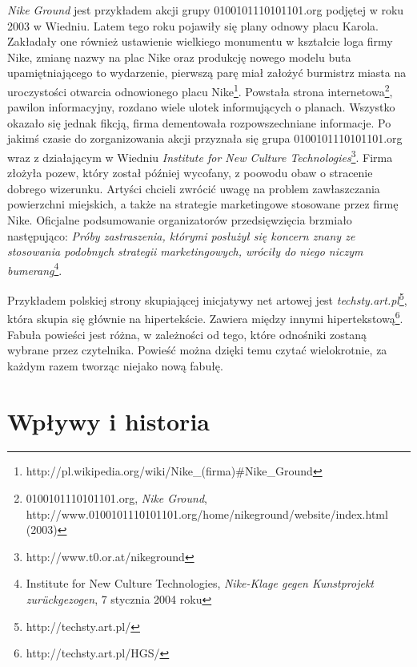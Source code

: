 \documentclass[a4paper,12pt,twoside]{article}
\begin{document}
\textit{Nike Ground} jest przykładem akcji grupy 
0100101110101101.org podjętej w roku 2003 w Wiedniu. Latem tego roku
pojawiły się plany odnowy placu Karola. Zakładały one również ustawienie
wielkiego monumentu w kształcie loga firmy Nike, zmianę nazwy na
plac Nike oraz produkcję nowego modelu buta upamiętniającego to wydarzenie,
pierwszą parę miał założyć burmistrz miasta na uroczystości otwarcia
odnowionego placu
Nike\footnote{http://pl.wikipedia.org/wiki/Nike\_(firma)\#Nike\_Ground}.
Powstała strona
internetowa\footnote{0100101110101101.org, \textit{Nike Ground}, 
http://www.0100101110101101.org/home/nikeground/website/index.html (2003)},
pawilon informacyjny, rozdano wiele ulotek informujących o planach.
Wszystko okazało się jednak fikcją, firma dementowała rozpowszechniane
informacje. Po jakimś czasie do zorganizowania akcji przyznała się
grupa 0100101110101101.org wraz z działającym w Wiedniu \textit{Institute
for New Culture Technologies}\footnote{http://www.t0.or.at/nikeground}.
Firma złożyła pozew, który został później wycofany, z poowodu obaw
o stracenie dobrego wizerunku. Artyści chcieli zwrócić uwagę na problem
zawłaszczania powierzchni miejskich, a także na strategie marketingowe
stosowane przez firmę Nike. Oficjalne podsumowanie organizatorów
przedsięwzięcia brzmiało następująco: \textit{Próby zastraszenia, którymi
posłużył się koncern znany ze stosowania podobnych strategii marketingowych,
wróciły do niego niczym bumerang}\footnote{Institute for New Culture
Technologies, \textit{Nike-Klage gegen Kunstprojekt zurückgezogen},
7 stycznia 2004 roku}.

Przykładem polskiej strony skupiającej inicjatywy net artowej jest
\textit{techsty.art.pl}\footnote{http://techsty.art.pl/},
która skupia się głównie na hipertekście. Zawiera między innymi
hipertekstową\footnote{http://techsty.art.pl/HGS/}. Fabuła powieści
jest różna, w zależności od tego, które odnośniki zostaną wybrane
przez czytelnika. Powieść można dzięki temu czytać wielokrotnie, za
każdym razem tworząc niejako nową fabułę.

\section{Wpływy i historia}
\end{document}
